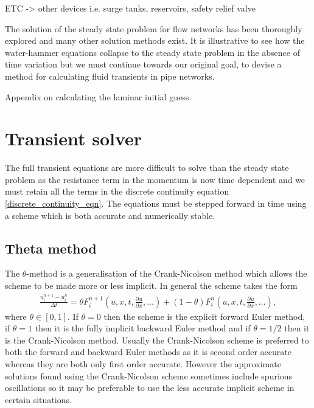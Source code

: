 \documentclass[12pt]{article}
\newcommand{\pardiv}[3]{\frac{\partial^{#1} #2}{\partial #3^{#1}}}
\begin{document}
{\color{red} ETC -> other devices i.e. surge tanks, reservoirs, safety relief valve}

The solution of the steady state problem for flow networks has been thoroughly explored and many other solution methods exist. It is illustrative to see how the water-hammer equations collapse to the steady state problem in the absence of time variation but we must continue towards our original goal, to devise a method for calculating fluid transients in pipe networks. 

{\color{red} Appendix on calculating the laminar initial guess.}

\section{Transient solver} \label{sec:transient_solver}

The full transient equations are more difficult to solve than the steady state problem as the resistance term in the momentum is now time dependent and we must retain all the terms in the discrete continuity equation \eqref{discrete_continuity_eqn}. The equations must be stepped forward in time using a scheme which is both accurate and numerically stable. 

\subsection{Theta method}

The $\theta$-method is a generalisation of the Crank-Nicolson method which allows the scheme to be made more or less implicit. In general the scheme takes the form
\begin{align}
\frac{u_i^{n+1} - u_i^{n}}{\Delta t} = \theta F_i^{n+1}\left(u,x,t,\pardiv{}{u}{x},\ldots \right) + (1-\theta) F_i^{n}\left(u,x,t,\pardiv{}{u}{x},\ldots \right),
\end{align}
where $\theta \in [0,1]$. If $\theta = 0$ then the scheme is the explicit forward Euler method, if $\theta = 1$ then it is the fully implicit backward Euler method and if $\theta = 1/2$ then it is the Crank-Nicolson method. Usually the Crank-Nicolson scheme is preferred to both the forward and backward Euler methods as it is second order accurate whereas they are both only first order accurate. However the approximate solutions found using the Crank-Nicolson scheme sometimes include spurious oscillations so it may be preferable to use the less accurate implicit scheme in certain situations.
\end{document}
